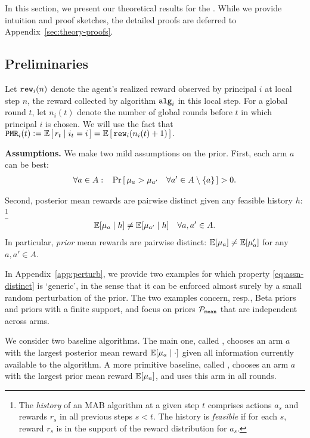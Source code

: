 
In this section, we present our theoretical results for the \TheoryModel. While we provide intuition and proof sketches, the detailed proofs are deferred to Appendix~\ref{sec:theory-proofs}.

\subsection{Preliminaries}
\label{sec:theory-prelims}

Let $\rew_i(n)$ denote the agent's realized reward observed by principal $i$ at local step $n$, \ie the reward collected by algorithm $\alg[i]$ in this local step. For a global round $t$, let $n_i(t)$ denote the number of global rounds before $t$ in which principal $i$ is chosen. We will use the fact that
    $ \PMR_i(t):=  \E\sbr{ r_t\mid i_t = i }
        = \E\sbr{ \rew_i(n_i(t)+1) }. $

\noindent\textbf{Assumptions.} We make two mild assumptions on the prior. First, each arm $a$ can be best:
\begin{align}\label{eq:assn-prob}
\forall a\in A:\;\;\;
\Pr\sbr{\mu_a  > \mu_{a'}
\quad \forall a'\in A\setminus \{a\}}
> 0.
\end{align}

\noindent Second, posterior mean rewards are pairwise distinct given any feasible history $h$:%
\footnote{The \emph{history} of an MAB algorithm at a given step $t$
  comprises actions $a_s$ and rewards $r_s$ in all
  previous steps $s<t$. The history is \emph{feasible} if for each $s$, reward $r_s$ is in the support of the reward distribution for $a_s$.}
\begin{align}\label{eq:assn-distinct}
    \E[\mu_a \mid h] \neq \E[\mu_{a'}\mid h] \quad \forall a,a'\in A.
\end{align}
In particular, \emph{prior} mean rewards are pairwise distinct:
$\E[\mu_a] \neq \E[\mu_a']$ for any $a,a'\in A$.

In Appendix~\ref{app:perturb}, we provide two examples for which property \eqref{eq:assn-distinct} is `generic', in the sense that it can be enforced almost surely by a small random perturbation of the prior. The two examples concern, resp., Beta priors and priors with a finite support, and focus on priors $\priorMu$ that are independent across arms.

We consider two baseline algorithms. The main one, called  \DynGreedy, chooses an arm $a$ with the largest posterior mean reward $\E[\mu_a \mid \cdot ]$ given all information currently available to the algorithm. A more primitive baseline, called \StaticGreedy, chooses an arm $a$ with the largest prior mean reward $\E[\mu_a]$, and uses this arm in all rounds.

